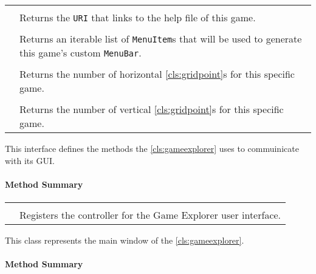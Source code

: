 \begin{longtable}{Lp{10cm}}
	 \\
	& Returns the \texttt{URI} that links to the help file of this game. \\
	 \\
	& Returns an iterable list of \texttt{MenuItem}s that will be used to generate this game's custom \texttt{MenuBar}. \\
	 \\
	& Returns the number of horizontal \ref{cls:gridpoint}s for this specific game. \\
	 \\
	& Returns the number of vertical \ref{cls:gridpoint}s for this specific game. \\
	\hline
\end{longtable}

\pagebreak

This interface defines the methods the \ref{cls:gameexplorer} uses to commuinicate with its \gls{GUI}. \\

\centerdash

\paragraph*{Method Summary}
\paragraph*{}
\begin{longtable}{Lp{10cm}}
	\startmethodtable
	 \\
	& Registers the controller for the Game Explorer user interface. \\
	\hline
\end{longtable}

\pagebreak

This class represents the main window of the \ref{cls:gameexplorer}. \\

\centerdash

\paragraph*{Method Summary}
